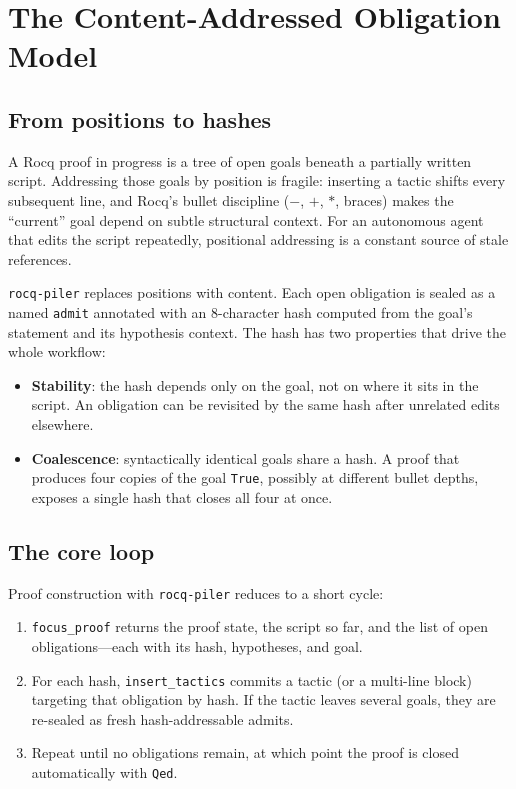 \documentclass[11pt,a4paper]{article}
\newcommand{\tool}{\texttt{rocq-piler}\xspace}
\begin{document}
\section{The Content-Addressed Obligation Model}
\label{sec:hashes}

\subsection{From positions to hashes}

A Rocq proof in progress is a tree of open goals beneath a partially written
script. Addressing those goals by position is fragile: inserting a tactic shifts
every subsequent line, and Rocq's bullet discipline ($-$, $+$, $*$, braces)
makes the ``current'' goal depend on subtle structural context. For an
autonomous agent that edits the script repeatedly, positional addressing is a
constant source of stale references.

\tool replaces positions with content. Each open obligation is sealed as a named
\texttt{admit} annotated with an 8-character hash computed from the goal's
statement and its hypothesis context. The hash has two properties that drive the
whole workflow:

\begin{itemize}
\item \textbf{Stability}: the hash depends only on the goal, not on where it sits
  in the script. An obligation can be revisited by the same hash after unrelated
  edits elsewhere.
\item \textbf{Coalescence}: syntactically identical goals share a hash. A proof
  that produces four copies of the goal \texttt{True}, possibly at different
  bullet depths, exposes a single hash that closes all four at once.
\end{itemize}

\subsection{The core loop}

Proof construction with \tool reduces to a short cycle:

\begin{enumerate}
\item \texttt{focus\_proof} returns the proof state, the script so far, and the
  list of open obligations---each with its hash, hypotheses, and goal.
\item For each hash, \texttt{insert\_tactics} commits a tactic (or a multi-line
  block) targeting that obligation by hash. If the tactic leaves several goals,
  they are re-sealed as fresh hash-addressable admits.
\item Repeat until no obligations remain, at which point the proof is closed
  automatically with \texttt{Qed}.
\end{enumerate}
\end{document}
